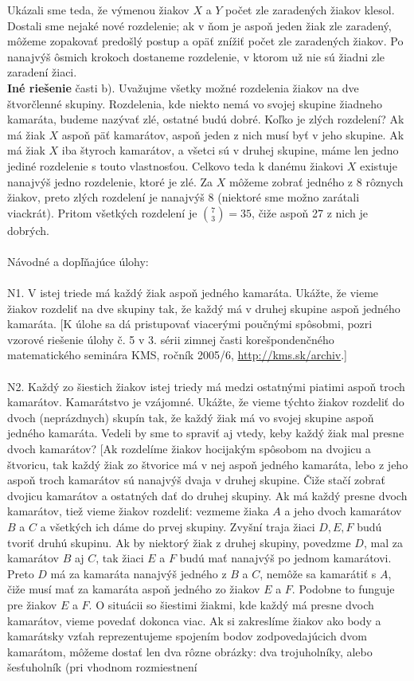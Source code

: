 Ukázali sme teda, že výmenou žiakov $X$ a $Y$ počet zle zaradených žiakov klesol. Dostali sme nejaké nové rozdelenie; ak v ňom je aspoň jeden žiak zle zaradený, môžeme zopakovať predošlý postup a opäť znížiť počet zle zaradených žiakov. Po nanajvýš ôsmich krokoch dostaneme rozdelenie, v ktorom už nie sú žiadni zle zaradení žiaci.\\
\textbf{Iné riešenie} časti b). Uvažujme všetky možné rozdelenia žiakov na dve štvorčlenné skupiny. Rozdelenia, kde niekto nemá vo svojej skupine žiadneho kamaráta, budeme nazývať zlé, ostatné budú dobré. Koľko je zlých rozdelení? Ak má žiak $X$ aspoň päť kamarátov, aspoň jeden z nich musí byť v jeho skupine. Ak má žiak $X$ iba štyroch kamarátov, a všetci sú v druhej skupine, máme len jedno jediné rozdelenie s touto vlastnosťou. Celkovo teda k danému
žiakovi $X$ existuje nanajvýš jedno rozdelenie, ktoré je zlé. Za $X$ môžeme zobrať jedného z 8 rôznych žiakov, preto zlých rozdelení je nanajvýš 8 (niektoré sme možno zarátali viackrát). Pritom všetkých rozdelení je $\binom{7}{3}=35$, čiže aspoň 27 z nich je dobrých.\\
\\
Návodné a dopľňajúce úlohy:\\
\\
N1. V istej triede má každý žiak aspoň jedného kamaráta. Ukážte, že vieme žiakov rozdeliť na dve skupiny tak, že každý má v druhej skupine aspoň jedného kamaráta. [K úlohe sa dá pristupovať viacerými poučnými spôsobmi, pozri vzorové riešenie úlohy č. 5 v 3. sérii zimnej časti korešpondenčného matematického seminára KMS, ročník 2005/6, \url{http://kms.sk/archiv}.]\\
\\
N2. Každý zo šiestich žiakov istej triedy má medzi ostatnými piatimi aspoň troch kamarátov. Kamarátstvo je vzájomné. Ukážte, že vieme týchto žiakov rozdeliť do dvoch (neprázdnych) skupín tak, že každý žiak má vo svojej skupine aspoň jedného kamaráta. Vedeli by sme to spraviť aj vtedy, keby každý žiak mal presne dvoch kamarátov? [Ak rozdelíme žiakov hocijakým spôsobom na dvojicu a štvoricu, tak každý žiak zo štvorice má v nej aspoň jedného kamaráta, lebo z jeho aspoň troch kamarátov sú nanajvýš dvaja v druhej skupine. Čiže stačí zobrať dvojicu kamarátov a ostatných dať do druhej skupiny. Ak má každý presne dvoch kamarátov, tiež vieme žiakov rozdeliť: vezmeme
žiaka $A$ a jeho dvoch kamarátov $B$ a $C$ a všetkých ich dáme do prvej skupiny. Zvyšní traja žiaci $D, E, F$ budú tvoriť druhú skupinu. Ak by niektorý žiak z druhej skupiny, povedzme $D$, mal za kamarátov $B$ aj $C$, tak žiaci $E$ a $F$ budú mať nanajvýš po jednom kamarátovi. Preto $D$ má za kamaráta nanajvýš jedného z $B$ a $C$, nemôže sa kamarátiť s $A$, čiže musí mať za kamaráta aspoň jedného zo žiakov $E$ a $F$. Podobne to funguje pre žiakov $E$ a $F$. O situácii so šiestimi žiakmi, kde každý má presne dvoch kamarátov, vieme povedať dokonca viac. Ak si zakreslíme žiakov ako body a kamarátsky vzťah reprezentujeme spojením bodov zodpovedajúcich dvom kamarátom, môžeme dostať len dva rôzne obrázky: dva trojuholníky, alebo šesťuholník (pri vhodnom rozmiestnení
